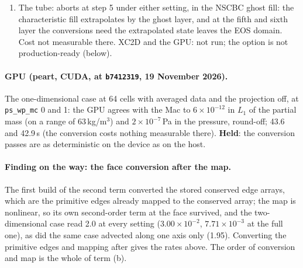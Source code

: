 \documentclass[11pt,a4paper]{article}
\newcommand{\code}[1]{\texttt{\small #1}}
\begin{document}
\begin{enumerate}[nosep]
      EOS domain (A6 near vacuum, B9 deep expansion, B11 the subcritical
      contact), the point value of a strong rarefaction cell leaving the
      branch; with the guards A6 and B11 run and B9 still aborts, now in the primitive conversion of a
      stage state (a vanishing liquid sliver whose phase energy the
      converted fluxes left inconsistent with its mass); the A/C mean
      0.0300 against 0.0297 ($+1.0\,\%$, inside the 2\,\% bound) with
      the rows moving by up to 18\,\% either way (A1 $\rho$ $+14\,\%$,
      A4 $+15\,\%$, A6 $+18\,\%$; A5 $-3\,\%$; B11 $P$ $-7\,\%$, B2 $u$
      $-16\,\%$): \textbf{refuted} on the aborts, held on the mean.
\item The tube: aborts at step 5 under either setting, in the NSCBC ghost
      fill: the characteristic fill extrapolates by the ghost layer, and
      at the fifth and sixth layer the conversions need the extrapolated
      state leaves the EOS domain.  Cost not measurable there.  XC2D and the GPU: not run; the option is
      not production-ready (below).
\end{enumerate}

\paragraph{GPU (peart, CUDA, at \code{b7412319}, 19 November 2026).}
The one-dimensional case at 64 cells with averaged data and the
projection off, at \code{ps\_wp\_mc} 0 and 1: the GPU agrees with the
Mac to $6\times10^{-12}$ in $L_1$ of the partial mass (on a range of
63\,kg/m$^3$) and $2\times10^{-7}$\,Pa in the pressure, round-off; 43.6
and 42.9\,s (the conversion costs nothing measurable there).
\textbf{Held}: the conversion passes are as deterministic on the device
as on the host.

\paragraph{Finding on the way: the face conversion after the map.}
The first build of the second term converted the stored conserved edge
arrays, which are the primitive edges already mapped to the conserved
array; the map is nonlinear, so its own second-order term at the face
survived, and the two-dimensional case read 2.0 at every setting
($3.00\times10^{-2}$, $7.71\times10^{-3}$ at the full one), as did the
same case advected along one axis only (1.95).  Converting the primitive
edges and mapping after gives the rates above.  The order of
conversion and map is the whole of term (b).
\end{document}

